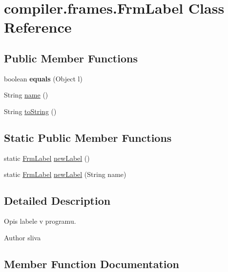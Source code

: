 \hypertarget{classcompiler_1_1frames_1_1_frm_label}{}\section{compiler.\+frames.\+Frm\+Label Class Reference}
\label{classcompiler_1_1frames_1_1_frm_label}
\subsection*{Public Member Functions}
\begin{DoxyCompactItemize}
\item 
\mbox{\label{classcompiler_1_1frames_1_1_frm_label_a6efe0c57eb359a9cf7f7c3bb707f1ed1}} 
boolean {\bfseries equals} (Object l)
\item 
String \hyperlink{classcompiler_1_1frames_1_1_frm_label_a9af9c0583efa460fedee5e9f640585d9}{name} ()
\item 
String \hyperlink{classcompiler_1_1frames_1_1_frm_label_a41c43f0b6fdbc91ba9a221eb1afe4b77}{to\+String} ()
\end{DoxyCompactItemize}
\subsection*{Static Public Member Functions}
\begin{DoxyCompactItemize}
\item 
static \hyperlink{classcompiler_1_1frames_1_1_frm_label}{Frm\+Label} \hyperlink{classcompiler_1_1frames_1_1_frm_label_a6e2d26f9dced44eaa1d47e5234239376}{new\+Label} ()
\item 
static \hyperlink{classcompiler_1_1frames_1_1_frm_label}{Frm\+Label} \hyperlink{classcompiler_1_1frames_1_1_frm_label_a4e721e7e5122368f1e1b48f44584ef4f}{new\+Label} (String name)
\end{DoxyCompactItemize}


\subsection{Detailed Description}
Opis labele v programu.

\begin{DoxyAuthor}{Author}
sliva 
\end{DoxyAuthor}


\subsection{Member Function Documentation}
\mbox{\label{classcompiler_1_1frames_1_1_frm_label_a9af9c0583efa460fedee5e9f640585d9}} 
